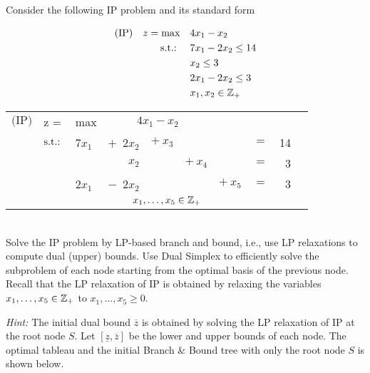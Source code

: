 Consider the following IP problem and its standard form

\begin{minipage}[c]{0.4\textwidth}
\begin{align*}
\text{(IP)} \quad z = \text{max} \quad & 4x_1 - x_2      \\
                   \mathop{\text{s.t.:~}} \quad & 7x_1 -  2x_2    \leq 14\\
                             & x_2 \leq 3 \\
		       		         & 2x_1 -     2x_2 \leq 3 \\
		     	             & x_1,x_2 \in \mathbb{Z}_+
\end{align*}
\end{minipage}
\begin{minipage}{0.5\textwidth}
\begin{table}[H]
	\centering
	\begin{tabular}{V{0.3cm} V{0.6cm} V{0.2cm} r V{0.1cm} V{0.1cm} V{0.4cm} V{0.2cm} r r}
        $\text{(IP)}$  & z =   &     max &                 \vspace{5pt}               \\
		               & $\mathop{\text{s.t.:~}}$ &  7$x_1$ &  $+$\ 2$x_2$ & $+ \ x_3$ &           &           & $=$ &  14 &             \\
					   &       &         &        $x_2$ &           & $+ \ x_4$ &           & $=$ &   3 &             \\
					   &       &  2$x_1$ &  $-$\ 2$x_2$ &           &           & $+ \ x_5$ & $=$ &   3 & \vspace{5pt}\\ 
	                   &    
	\end{tabular}
\end{table}
\end{minipage}\\

Solve the IP problem by LP-based branch and bound, i.e., use LP relaxations to compute dual (upper) bounds. Use Dual Simplex to efficiently solve the subproblem of each node starting from the optimal basis of the previous node. Recall that the LP relaxation of IP is obtained by relaxing the variables $x_1,\dots,x_5\in \mathbb{Z}_+$ to $x_1,\dots,x_5 \geq 0$.

\emph{Hint:} The initial dual bound $\overline{z}$ is obtained by solving the LP relaxation of IP at the root node $S$. Let $[\underline{z},\overline{z}]$ be the lower and upper bounds of each node. The optimal tableau and the initial Branch \& Bound  tree with only the root node $S$ is shown below. 

